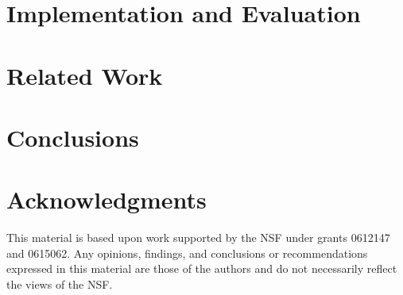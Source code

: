 \documentclass[nocopyrightspace]{sigplanconf}
\begin{document}
\section{\padsd{} Implementation and Evaluation}
\label{sec:implementation}


\section{Related Work}
\label{sec:related}


\section{Conclusions}
\label{sec:conclusions}


\section*{Acknowledgments}

This material is based upon work 
supported by the NSF
   under grants 0612147 and 0615062.
Any opinions, findings, and conclusions or recommendations
   expressed in this material are those of the authors and do not
   necessarily reflect the views of the NSF.



\end{document}
